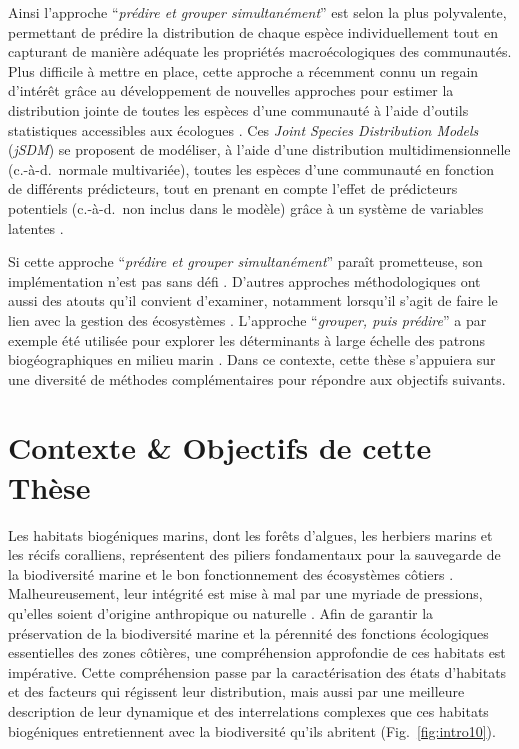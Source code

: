 \begin{refsection}
Ainsi l'approche ``\emph{prédire et grouper simultanément}'' est selon
\textcite{Ferrier_2006} la plus polyvalente, permettant de prédire la
distribution de chaque espèce individuellement tout en capturant de
manière adéquate les propriétés macroécologiques des communautés. Plus
difficile à mettre en place, cette approche a récemment connu un regain
d'intérêt grâce au développement de nouvelles approches pour estimer la
distribution jointe de toutes les espèces d'une communauté à l'aide
d'outils statistiques accessibles aux écologues \autocites[
]{Warton_2015}[ ]{Hui_2016}[ ]{Ovaskainen_2017a}[ ]{Niku_2019}[
]{Chiquet_2021}{Pichler_2020}. Ces \emph{Joint Species Distribution
Models} (\emph{jSDM}) se proposent de modéliser, à l'aide d'une
distribution multidimensionnelle (c.-à-d.~normale multivariée), toutes
les espèces d'une communauté en fonction de différents prédicteurs, tout
en prenant en compte l'effet de prédicteurs potentiels (c.-à-d.~non
inclus dans le modèle) grâce à un système de variables latentes
\autocite{Warton_2015}.

\pagebreak

Si cette approche ``\emph{prédire et grouper simultanément}'' paraît
prometteuse, son implémentation n'est pas sans défi \autocites[
]{Poggiato_2021}{DAmen_2017}. D'autres approches méthodologiques ont
aussi des atouts qu'il convient d'examiner, notamment lorsqu'il s'agit
de faire le lien avec la gestion des écosystèmes \autocites[
]{DAmen_2017}{Pollock_2020}. L'approche ``\emph{grouper, puis prédire}''
a par exemple été utilisée pour explorer les déterminants à large
échelle des patrons biogéographiques en milieu marin
\autocite{Belanger_2012}. Dans ce contexte, cette thèse s'appuiera sur
une diversité de méthodes complémentaires pour répondre aux objectifs
suivants.

\clearpage

\hypertarget{contexte-objectifs-de-cette-thuxe8se}{%
\section{Contexte \& Objectifs de cette
Thèse}\label{contexte-objectifs-de-cette-thuxe8se}}

Les habitats biogéniques marins, dont les forêts d'algues, les herbiers
marins et les récifs coralliens, représentent des piliers fondamentaux
pour la sauvegarde de la biodiversité marine et le bon fonctionnement
des écosystèmes côtiers \autocite{ipbes_2019}. Malheureusement, leur
intégrité est mise à mal par une myriade de pressions, qu'elles soient
d'origine anthropique ou naturelle \autocite{ipbes_2019}. Afin de
garantir la préservation de la biodiversité marine et la pérennité des
fonctions écologiques essentielles des zones côtières, une compréhension
approfondie de ces habitats est impérative. Cette compréhension passe
par la caractérisation des états d'habitats et des facteurs qui
régissent leur distribution, mais aussi par une meilleure description de
leur dynamique et des interrelations complexes que ces habitats
biogéniques entretiennent avec la biodiversité qu'ils abritent
(Fig.~\ref{fig:intro10}).


\end{refsection}

